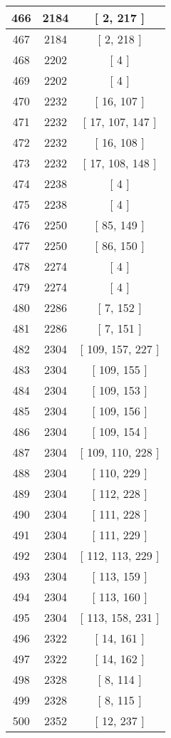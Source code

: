 \begin{center}
\begin{longtable}[H]{|| c c c ||}
\hline
466 & 2184 & [ 2, 217 ] \\ 
\hline
467 & 2184 & [ 2, 218 ] \\ 
\hline
468 & 2202 & [ 4 ] \\ 
\hline
469 & 2202 & [ 4 ] \\ 
\hline
470 & 2232 & [ 16, 107 ] \\ 
\hline
471 & 2232 & [ 17, 107, 147 ] \\ 
\hline
472 & 2232 & [ 16, 108 ] \\ 
\hline
473 & 2232 & [ 17, 108, 148 ] \\ 
\hline
474 & 2238 & [ 4 ] \\ 
\hline
475 & 2238 & [ 4 ] \\ 
\hline
476 & 2250 & [ 85, 149 ] \\ 
\hline
477 & 2250 & [ 86, 150 ] \\ 
\hline
478 & 2274 & [ 4 ] \\ 
\hline
479 & 2274 & [ 4 ] \\ 
\hline
480 & 2286 & [ 7, 152 ] \\ 
\hline
481 & 2286 & [ 7, 151 ] \\ 
\hline
482 & 2304 & [ 109, 157, 227 ] \\ 
\hline
483 & 2304 & [ 109, 155 ] \\ 
\hline
484 & 2304 & [ 109, 153 ] \\ 
\hline
485 & 2304 & [ 109, 156 ] \\ 
\hline
486 & 2304 & [ 109, 154 ] \\ 
\hline
487 & 2304 & [ 109, 110, 228 ] \\ 
\hline
488 & 2304 & [ 110, 229 ] \\ 
\hline
489 & 2304 & [ 112, 228 ] \\ 
\hline
490 & 2304 & [ 111, 228 ] \\ 
\hline
491 & 2304 & [ 111, 229 ] \\ 
\hline
492 & 2304 & [ 112, 113, 229 ] \\ 
\hline
493 & 2304 & [ 113, 159 ] \\ 
\hline
494 & 2304 & [ 113, 160 ] \\ 
\hline
495 & 2304 & [ 113, 158, 231 ] \\ 
\hline
496 & 2322 & [ 14, 161 ] \\ 
\hline
497 & 2322 & [ 14, 162 ] \\ 
\hline
498 & 2328 & [ 8, 114 ] \\ 
\hline
499 & 2328 & [ 8, 115 ] \\ 
\hline
500 & 2352 & [ 12, 237 ] \\ 

\end{longtable}
\end{center}
